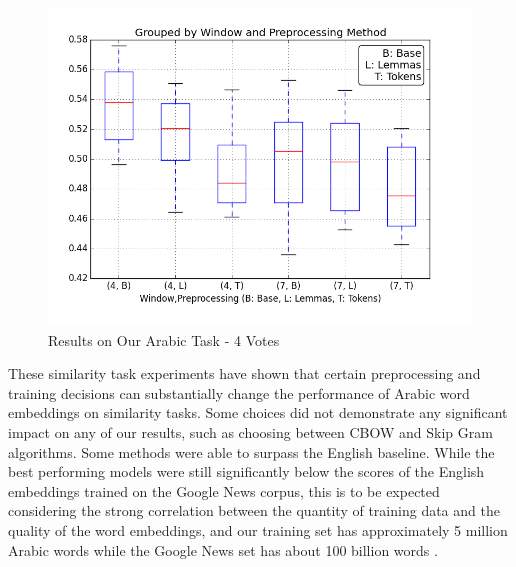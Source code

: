\begin{figure}
  \includegraphics[width=\linewidth]{results_spearman/ar_similiarity_task_4_votes_results_spearplot.png}
  \caption{Results on Our Arabic Task - 4 Votes}
  \label{fig:spearplot4}
\end{figure}

These similarity task experiments have shown that certain preprocessing and training decisions can substantially change the performance of Arabic word embeddings on similarity tasks. Some choices did not demonstrate any significant impact on any of our results, such as choosing between CBOW and Skip Gram algorithms. Some methods were able to surpass the English baseline. While the best performing models were still significantly below the scores of the English embeddings trained on the Google News corpus, this is to be expected considering the strong correlation between the quantity of training data and the quality of the word embeddings, and our training set has approximately 5 million Arabic words while the Google News set has about 100 billion words \cite{mikolovdist:2013}.




